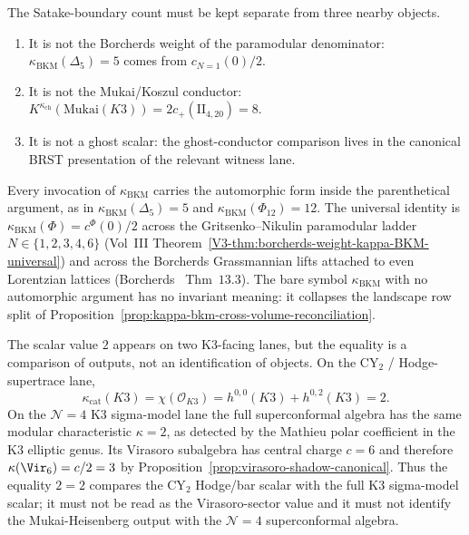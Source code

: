 \begin{remark}%
\label{rem:concordance-plus-two-three-lenses}%
The Satake-boundary count must be kept separate from three nearby
objects.
\begin{enumerate}[label=\textup{(\roman*)}]
\item It is not the Borcherds weight of the paramodular denominator:
 $\kappa_{\mathrm{BKM}}(\Delta_5)=5$ comes from
 $c_{N=1}(0)/2$.
\item It is not the Mukai/Koszul conductor:
 $K^{\kappa_{\mathrm{ch}}}(\mathrm{Mukai}(K3))=2c_+(\mathrm{II}_{4,20})=8$.
\item It is not a ghost scalar:
 the ghost-conductor comparison lives in the canonical BRST
 presentation of the relevant witness lane.
\end{enumerate}
\end{remark}

\begin{remark}%
\label{rem:bkm-gate-zero-lifted}%
Every invocation of $\kappa_{\mathrm{BKM}}$ carries the automorphic
form inside the parenthetical argument, as in
$\kappa_{\mathrm{BKM}}(\Delta_5) = 5$ and
$\kappa_{\mathrm{BKM}}(\Phi_{12}) = 12$. The universal identity is
$\kappa_{\mathrm{BKM}}(\Phi) = c^\Phi(0)/2$ across the Gritsenko--Nikulin
paramodular ladder $N \in \{1,2,3,4,6\}$ (Vol~III
Theorem~\ref{V3-thm:borcherds-weight-kappa-BKM-universal}) and across the
Borcherds Grassmannian lifts attached to even Lorentzian lattices
(Borcherds~\cite{Bor95} Thm~$13.3$). The bare symbol
$\kappa_{\mathrm{BKM}}$ with no automorphic argument has no invariant
meaning: it collapses the landscape row split of
Proposition~\ref{prop:kappa-bkm-cross-volume-reconciliation}.
\end{remark}

\begin{remark}[The K3 value $\kappa=2$ on distinct lanes]%
\label{rem:k3-kappa-two-shared-not-identification}%
The scalar value $2$ appears on two K3-facing lanes, but the equality
is a comparison of outputs, not an identification of objects. On the
CY$_2$ / Hodge-supertrace lane,
\[
 \kappa_{\mathrm{cat}}(K3)=\chi(\mathcal O_{K3})
 =h^{0,0}(K3)+h^{0,2}(K3)=2.
\]
On the $\mathcal N{=}4$ K3 sigma-model lane the full superconformal
algebra has the same modular characteristic $\kappa=2$, as detected by
the Mathieu polar coefficient in the K3 elliptic genus. Its Virasoro
subalgebra has central charge $c=6$ and therefore
$\kappa(\Vir_6)=c/2=3$ by
Proposition~\ref{prop:virasoro-shadow-canonical}. Thus the equality
$2=2$ compares the CY$_2$ Hodge/bar scalar with the full K3
sigma-model scalar; it must not be read as the Virasoro-sector value
and it must not identify the Mukai-Heisenberg output with the
$\mathcal N{=}4$ superconformal algebra.
\end{remark}

